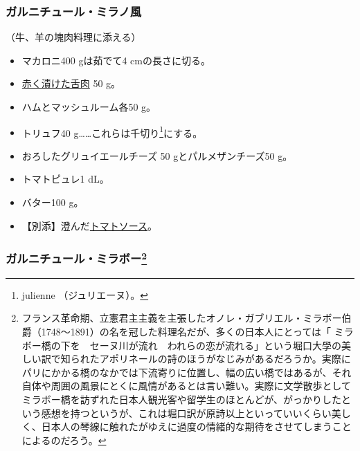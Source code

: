 \begin{recette}
{\subsubsection{ガルニチュール・ミラノ風}\label{garniture-milanaise}}



（牛、羊の塊肉料理に添える）

\begin{itemize}
\item
  マカロニ400 gは茹でて4 cmの長さに切る。
\item
  \protect\hyperlink{saumure-liquide-pour-langues}{赤く漬けた舌肉} 50
  g。
\item
  ハムとマッシュルーム各50 g。
\item
  トリュフ40 g\ldots{}\ldots{}これらは千切り\footnote{julienne
    （ジュリエーヌ）。}にする。
\item
  おろしたグリュイエールチーズ 50 gとパルメザンチーズ50 g。
\item
  トマトピュレ1 dL。
\item
  バター100 g。
\item
  【別添】澄んだ\protect\hyperlink{sauce-tomate}{トマトソース}。
\end{itemize}

\atoaki{}

\hypertarget{garniture-mirabeau}{%
\subsubsection[ガルニチュール・ミラボー]{\texorpdfstring{ガルニチュール・ミラボー\footnote{フランス革命期、立憲君主主義を主張したオノレ・ガブリエル・ミラボー伯爵（1748〜1891）の名を冠した料理名だが、多くの日本人にとっては「
  ミラボー橋の下を　セーヌ川が流れ　われらの恋が流れる」という堀口大學の美しい訳で知られたアポリネールの詩のほうがなじみがあるだろうか。実際にパリにかかる橋のなかでは下流寄りに位置し、幅の広い橋ではあるが、それ自体や周囲の風景にとくに風情があるとは言い難い。実際に文学散歩としてミラボー橋を訪ずれた日本人観光客や留学生のほとんどが、がっかりしたという感想を持つというが、これは堀口訳が原詩以上といっていいくらい美しく、日本人の琴線に触れたがゆえに過度の情緒的な期待をさせてしまうことによるのだろう。}}{ガルニチュール・ミラボー}}\label{garniture-mirabeau}}


\end{recette}
